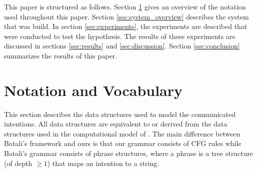 \documentclass[a4paper]{article}
\begin{document}
This paper is structured as follows. Section \ref{sec:Notation and Vocabulary} gives an overview of the notation used throughout this paper. Section \ref{sec:system_overview} describes the system that was build. In section \ref{sec:experiments}, the experiments are described that were conducted to test the hypothesis. The results of these experiments are discussed in sections \ref{sec:results} and \ref{sec:discussion}. Section \ref{sec:conclusion} summarizes the results of this paper.


\section{Notation and Vocabulary}
\label{sec:Notation and Vocabulary}
This section describes the data structures used to model the communicated intentions. All data structures are equivalent to or derived from the data structures used in the computational model of \cite{batali1999negotiation}. The main difference between Batali's framework and ours is that our grammar consists of CFG rules while Batali's grammar consists of phrase structures, where a phrase is a tree structure (of depth $\ge 1$) that maps an intention to a string.
\end{document}
